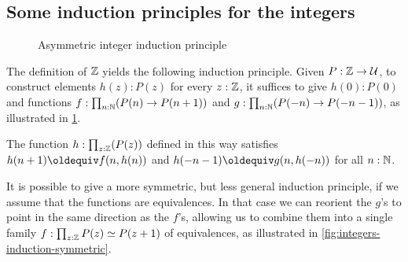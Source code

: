 \documentclass[a4paper,12pt]{amsart}
\begin{document}
\subsection{Some induction principles for the integers}
\label{sec:integers-induction}

\begin{figure}[b]
  \centering
  \caption{Asymmetric integer induction principle}
  \label{fig:integers-induction-asymmetric}
\end{figure}

The definition of $\mathbb{Z}$ yields the following induction principle.
Given $P : \mathbb{Z} \to \mathcal{U}$, to construct elements $h(z) : P(z)$ for every $z : \mathbb{Z}$,
it suffices to give $h(0): P(0)$ and functions
$f : \prod_{n:\mathbb{N}}(P(n) \to P(n+1))$ and
$g : \prod_{n:\mathbb{N}}(P(-n) \to P(-n-1))$,
as illustrated in \cref{fig:integers-induction-asymmetric}.

The function $h:\prod_{z:\mathbb{Z}}(P(z))$ defined in this way satisfies
$h(n+1)\jdeq f(n,h(n))$ and $h(-n-1)\jdeq g(n,h(-n))$ for all $n:\mathbb{N}$.

It is possible to give a more symmetric, but less general induction principle,
if we assume that the functions are equivalences.
In that case we can reorient the $g$'s to point in the same direction as the $f$'s,
allowing us to combine them into a single family $f : \prod_{z:\mathbb{Z}}P(z) \simeq P(z+1)$ of equivalences,
as illustrated in \cref{fig:integers-induction-symmetric}.
\end{document}
